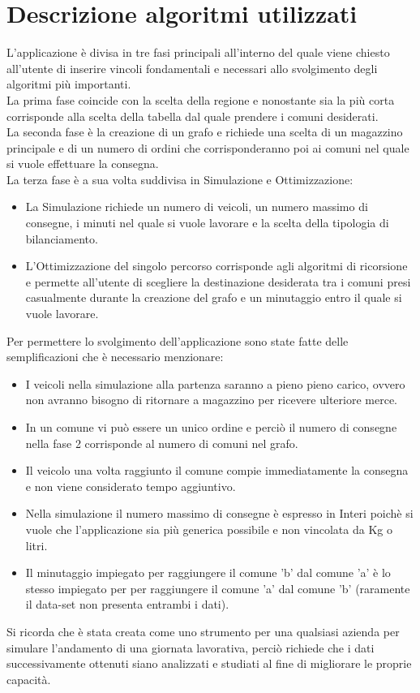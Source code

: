 \documentclass[a4paper,12pt]{report}
\begin{document}
\section{Descrizione algoritmi utilizzati}
\label{Sec:Algoritmi}
L'applicazione è divisa in tre fasi principali all'interno del quale viene chiesto all'utente di
inserire vincoli fondamentali e necessari allo svolgimento degli algoritmi più importanti.\\
La prima fase coincide con la scelta della regione e nonostante sia la più corta corrisponde alla
scelta della tabella dal quale prendere i comuni desiderati.\\
La seconda fase è la creazione di un grafo e richiede una scelta di un magazzino principale e di
un numero di ordini che corrisponderanno poi ai comuni nel quale si vuole effettuare la consegna.\\
La terza fase è a sua volta suddivisa in Simulazione e Ottimizzazione:
\begin{itemize}
	\item La Simulazione richiede un numero di veicoli, un numero massimo di consegne, i minuti nel quale 
si vuole lavorare e la scelta della tipologia di bilanciamento.
	\item L'Ottimizzazione del singolo percorso corrisponde agli algoritmi di ricorsione e permette all'utente di scegliere la destinazione desiderata tra i comuni presi casualmente durante la creazione del grafo e un minutaggio entro il quale si vuole lavorare.
\end{itemize}
Per permettere lo svolgimento dell'applicazione sono state fatte delle semplificazioni che è necessario menzionare:
\begin{itemize}
	\item I veicoli nella simulazione alla partenza saranno a pieno pieno carico, ovvero non avranno bisogno di ritornare a magazzino per ricevere ulteriore merce.
	\item In un comune vi può essere un unico ordine e perciò il numero di consegne nella fase 2 corrisponde al numero di comuni nel grafo.
	\item Il veicolo una volta raggiunto il comune compie immediatamente la consegna e non viene considerato tempo aggiuntivo.
	\item Nella simulazione il numero massimo di consegne è espresso in Interi poichè si vuole che l'applicazione sia più generica possibile e non vincolata da Kg o litri.
	\item Il minutaggio impiegato per raggiungere il comune 'b' dal comune 'a' è lo stesso impiegato per  per raggiungere il comune
'a' dal comune 'b' (raramente il data-set non presenta entrambi i dati).
\end{itemize}
Si ricorda che è stata creata come uno strumento per una qualsiasi azienda per simulare l'andamento di una giornata lavorativa, perciò richiede che i dati successivamente ottenuti siano analizzati e studiati
al fine di migliorare le proprie capacità.
\end{document}
